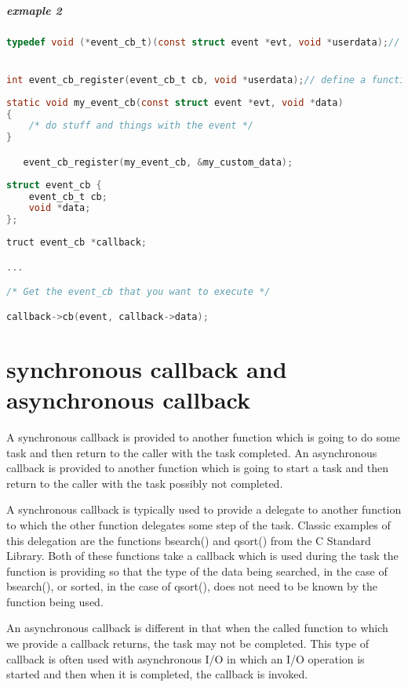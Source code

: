 \documentclass{book}
\begin{document}
\paragraph{exmaple 2}
\begin{lstlisting}[caption={server}, language=C]
typedef void (*event_cb_t)(const struct event *evt, void *userdata);// define the type of function used for the callback


int event_cb_register(event_cb_t cb, void *userdata);// define a function that is used to register a callback:
\end{lstlisting}

\begin{lstlisting}[caption={user to register a callback}, language=C]
static void my_event_cb(const struct event *evt, void *data)
{
    /* do stuff and things with the event */
}

   event_cb_register(my_event_cb, &my_custom_data);
\end{lstlisting}


\begin{lstlisting}[caption={internal of the event dispatcher}, language=C]
struct event_cb {
    event_cb_t cb;
    void *data;
};
\end{lstlisting}

\begin{lstlisting}[caption={execute a callback}, language=C]
truct event_cb *callback;

...

/* Get the event_cb that you want to execute */

callback->cb(event, callback->data);
\end{lstlisting}



\chapter{synchronous callback and asynchronous callback} 
A synchronous callback is provided to another function which is going to do some task and then return to the caller with the task completed. 
An asynchronous callback is provided to another function which is going to start a task and then return to the caller with the task possibly not completed.

A synchronous callback is typically used to provide a delegate to another function to which the other function delegates some step of the task. 
Classic examples of this delegation are the functions bsearch() and qsort() from the C Standard Library. 
Both of these functions take a callback which is used during the task the function is providing so that the type of the data being searched, 
in the case of bsearch(), or sorted, in the case of qsort(), does not need to be known by the function being used.

An asynchronous callback is different in that when the called function to which we provide a callback returns, the task may not be completed. 
This type of callback is often used with asynchronous I/O in which an I/O operation is started and then when it is completed, the callback is invoked.
\end{document}
